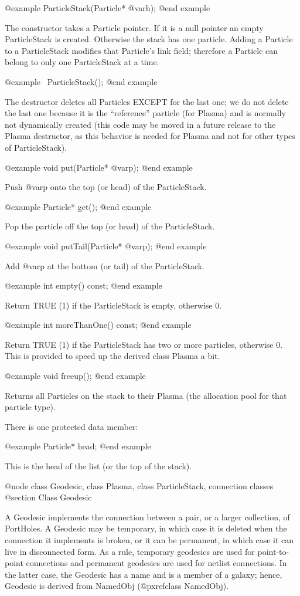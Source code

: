 @example
ParticleStack(Particle* @var{h});
@end example

The constructor takes a Particle pointer.  If it is a null pointer an
empty ParticleStack is created.  Otherwise the stack has one particle.
Adding a Particle to a ParticleStack modifies that Particle's link
field; therefore a Particle can belong to only one ParticleStack at a
time.

@example
~ParticleStack();
@end example

The destructor deletes all Particles EXCEPT for the last one; we do not
delete the last one because it is the ``reference'' particle (for
Plasma) and is normally not dynamically created (this code may be moved
in a future release to the Plasma destructor, as this behavior is needed
for Plasma and not for other types of ParticleStack).

@example
void put(Particle* @var{p});
@end example

Push @var{p} onto the top (or head) of the ParticleStack.

@example
Particle* get();
@end example

Pop the particle off the top (or head) of the ParticleStack.

@example
void putTail(Particle* @var{p});
@end example

Add @var{p} at the bottom (or tail) of the ParticleStack.

@example
int empty() const;
@end example

Return TRUE (1) if the ParticleStack is empty, otherwise 0.

@example
int moreThanOne() const;
@end example

Return TRUE (1) if the ParticleStack has two or more particles,
otherwise 0.  This is provided to speed up the derived class Plasma a
bit.

@example
void freeup();
@end example

Returns all Particles on the stack to their Plasma (the allocation pool
for that particle type).

There is one protected data member:

@example
Particle* head;
@end example

This is the head of the list (or the top of the stack).

@node class Geodesic, class Plasma, class ParticleStack, connection classes
@section Class Geodesic

A Geodesic implements the connection between a pair, or a larger
collection, of PortHoles.  A Geodesic may be temporary, in which case it
is deleted when the connection it implements is broken, or it can be
permanent, in which case it can live in disconnected form.  As a rule,
temporary geodesics are used for point-to-point connections and
permanent geodesics are used for netlist connections.  In the latter
case, the Geodesic has a name and is a member of a galaxy; hence,
Geodesic is derived from NamedObj (@pxref{class NamedObj}).

